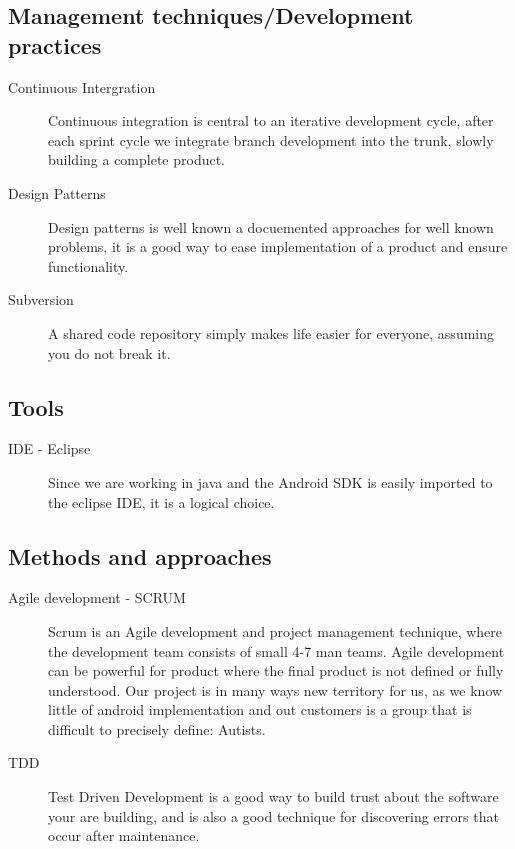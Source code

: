 \subsection*{Management techniques/Development practices}
\begin{description}
 \item [Continuous Intergration] Continuous integration is central to an iterative development cycle, after each sprint cycle we integrate branch development into the trunk, slowly building a complete product.
 \item [Design Patterns] Design patterns is well known a docuemented approaches for well known problems, it is a good way to ease implementation of a product and ensure functionality.
 \item [Subversion] A shared code repository simply makes life easier for everyone, assuming you do not break it.
\end{description}

\subsection*{Tools}
\begin{description}
 \item [IDE - Eclipse] Since we are working in java and the Android SDK is easily imported to the eclipse IDE, it is a logical choice.
\end{description}


\subsection*{Methods and approaches}
\begin{description}
 \item [Agile development - SCRUM] Scrum is an Agile development and project management technique, where the development team consists of small 4-7 man teams. Agile development can be powerful for product where the final
product is not defined or fully understood. Our project is in many ways new territory for us, as we know little of android implementation and out customers is a group that is difficult to precisely define: Autists.
 \item [TDD] Test Driven Development is a good way to build trust about the software your are building, and is also a good technique for discovering errors that occur after maintenance.
\end{description}


